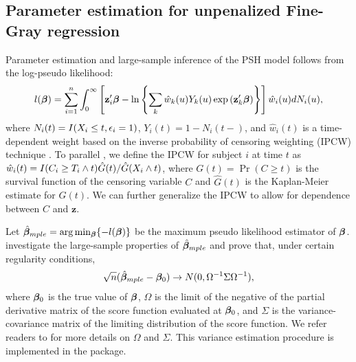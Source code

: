 \subsection{Parameter estimation for unpenalized Fine-Gray regression}
Parameter estimation and large-sample inference of the PSH model follows from the log-pseudo likelihood:
\begin{align}
\label{eq3:lpp}
l(\bm \beta) = \sum_{i=1}^n  \int_0^\infty \left[ \mathbf{z}_i^\prime \bm \beta - \ln \left\{ \sum_k \hat{w}_k(u) Y_k(u) \exp \left(\mathbf{z}_k^\prime \bm \beta \right) \right\} \right] \hat{w}_i(u)dN_i(u),
\end{align}
where $N_i(t) = I(X_i \leq t, \epsilon_i = 1)$, $Y_i(t) = 1 - N_i(t-)$, and $\hat{w}_i(t)$ is a time-dependent weight based on the inverse probability of censoring weighting (IPCW) technique \citep{robins1992recovery}. To parallel \cite{fine1999proportional}, we define the  IPCW for subject $i$ at time $t$ as $\hat{w}_i(t) = I(C_i \geq T_i \wedge t)\hat{G}(t)/\hat{G}(X_i \wedge t)$, where $G(t) = \Pr(C \geq t)$ is the survival function of the censoring variable $C$ and $\hat{G}(t)$ is the Kaplan-Meier estimate for $G(t)$. We can further generalize the IPCW to allow for dependence between $C$ and $\mathbf{z}$.

Let $\hat{\bm \beta}_{mple} = \arg \min_{\bm \beta} \{-l(\bm \beta)\}$ be the maximum pseudo likelihood estimator of $\bm \beta$. \cite{fine1999proportional} investigate the large-sample properties of $\hat{\bm \beta}_{mple}$ and prove that, under certain regularity conditions, 
\begin{align}
\label{eq3:asymptotic}
\sqrt{n}(\hat{\bm \beta}_{mple} - \bm \beta_0) \to N(0, \Omega^{-1} \Sigma \Omega^{-1}),
\end{align}
where $\bm \beta_0$ is the true value of $\bm \beta$, $\Omega$ is the limit of the negative of the partial derivative matrix of the score function evaluated at $\bm \beta_0$, and $\Sigma$ is the variance-covariance matrix of the limiting distribution of the score function. We refer readers to \cite{fine1999proportional} for more details on $\Omega$ and $\Sigma$. This variance estimation procedure is implemented in the   package.

